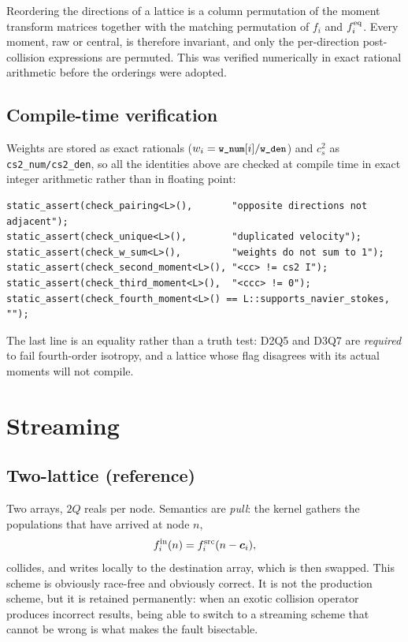 \documentclass[11pt,a4paper]{article}
\newcommand{\code}[1]{\texttt{\small #1}}
\newcommand{\cs}{c_s}
\newcommand{\ci}{\bm{c}_i}
\begin{document}
Reordering the directions of a lattice is a column permutation of the moment
transform matrices together with the matching permutation of $f_i$ and
$f_i^{\rm eq}$. Every moment, raw or central, is therefore invariant, and only
the per-direction post-collision expressions are permuted. This was verified
numerically in exact rational arithmetic before the orderings were adopted.

\subsection{Compile-time verification}

Weights are stored as exact rationals ($w_i = \code{w\_num}[i]/\code{w\_den}$) and
$\cs^2$ as \code{cs2\_num/cs2\_den}, so all the identities above are checked at
compile time in exact integer arithmetic rather than in floating point:

\begin{lstlisting}[basicstyle=\ttfamily\scriptsize]
static_assert(check_pairing<L>(),       "opposite directions not adjacent");
static_assert(check_unique<L>(),        "duplicated velocity");
static_assert(check_w_sum<L>(),         "weights do not sum to 1");
static_assert(check_second_moment<L>(), "<cc> != cs2 I");
static_assert(check_third_moment<L>(),  "<ccc> != 0");
static_assert(check_fourth_moment<L>() == L::supports_navier_stokes, "");
\end{lstlisting}

The last line is an equality rather than a truth test: D2Q5 and D3Q7 are
\emph{required} to fail fourth-order isotropy, and a lattice whose flag disagrees
with its actual moments will not compile.

\section{Streaming}
\label{sec:streaming}

\subsection{Two-lattice (reference)}

Two arrays, $2Q$ reals per node. Semantics are \emph{pull}: the kernel gathers
the populations that have arrived at node $n$,
\begin{equation}
  f_i^{\rm in}(n) = f_i^{\rm src}(n - \ci),
\end{equation}
collides, and writes locally to the destination array, which is then swapped.
This scheme is obviously race-free and obviously correct. It is not the
production scheme, but it is retained permanently: when an exotic collision
operator produces incorrect results, being able to switch to a streaming scheme
that cannot be wrong is what makes the fault bisectable.
\end{document}
